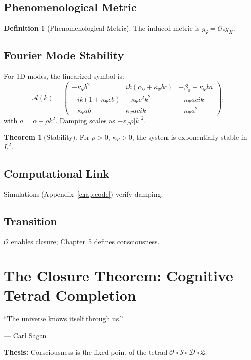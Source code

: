 \documentclass[12pt]{book}
\theoremstyle{definition}
\newtheorem{definition}{Definition}[chapter]
\newtheorem{theorem}{Theorem}[chapter]
\begin{document}
\section{Phenomenological Metric}
\begin{definition}[Phenomenological Metric]
\label{def:pheno_metric}
The induced metric is $g_\Psi = \mathcal{O}_* g_X$.
\end{definition}

\section{Fourier Mode Stability}
For 1D modes, the linearized symbol is:
\begin{equation}
\mathcal{A}(k) =
\begin{pmatrix}
-\kappa_\Psi b^2 & i k(\alpha_0 + \kappa_\Psi b c) & -\beta_0 - \kappa_\Psi b a \\
- i k(1 + \kappa_\Psi c b) & -\kappa_\Psi c^2 k^2 & - \kappa_\Psi a c i k \\
-\kappa_\Psi a b & \kappa_\Psi a c i k & -\kappa_\Psi a^2
\end{pmatrix},
\end{equation}
with $a = \alpha - \rho k^2$. Damping scales as $-\kappa_\Psi \rho |k|^2$.

\begin{theorem}[Stability]
\label{thm:stability}
For $\rho > 0$, $\kappa_\Psi > 0$, the system is exponentially stable in $L^2$.
\end{theorem}

\section{Computational Link}
Simulations (Appendix~\ref{chap:code}) verify damping.

\section{Transition}
$\mathcal{O}$ enables closure; Chapter~\ref{chap:closure} defines consciousness.

\chapter{The Closure Theorem: Cognitive Tetrad Completion}
\label{chap:closure}
\epigraph{``The universe knows itself through us.''}{--- Carl Sagan}

\textbf{Thesis:} Consciousness is the fixed point of the tetrad $\mathcal{O} \circ \mathcal{S} \circ \mathcal{D} \circ \mathfrak{L}$.
\end{document}
